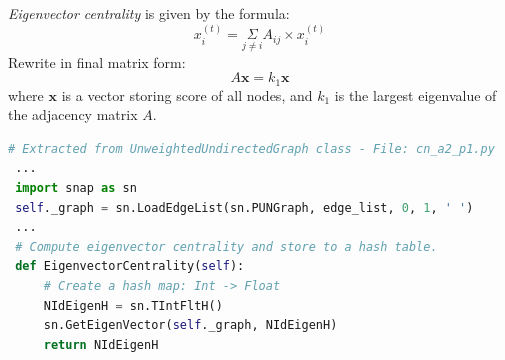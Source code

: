 \documentclass[a4paper,12pt]{article}
\begin{document}
\noindent
\emph{Eigenvector centrality} is given by the formula:
$$ x_i^{(t)}= \underset{j \neq i}{\Sigma} A_{ij} \times x_i^{(t)} $$
Rewrite in final matrix form:
$$ A\boldsymbol{x} = k_1\boldsymbol{x} $$
where $\boldsymbol{x}$ is a vector storing score of all nodes, and $k_1$ is the largest eigenvalue of the adjacency matrix $A$.

\begin{lstlisting}[language=Python, caption={Eigenvector centrality computation with SNAP.PY}, label={lst:eig}]
 # Extracted from UnweightedUndirectedGraph class - File: cn_a2_p1.py
 ...
 import snap as sn
 self._graph = sn.LoadEdgeList(sn.PUNGraph, edge_list, 0, 1, ' ')
 ...
 # Compute eigenvector centrality and store to a hash table.
 def EigenvectorCentrality(self):
     # Create a hash map: Int -> Float
     NIdEigenH = sn.TIntFltH()
     sn.GetEigenVector(self._graph, NIdEigenH)
     return NIdEigenH
\end{lstlisting}

\pagebreak
\end{document}
